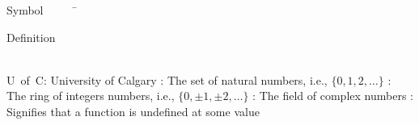 


\begin{tabbing}
Symbol~~~~~\= \ \ \ \ \ \ \ \ \ \ \ \ \ \ \ \ \ \ \ \ \ \ \ \ \ \ \ \ \ \ \ \ \ \ \ \  \parbox{5in}{Definition}\\

\addsymbol \mbox{U of C}: {University of Calgary}
\addsymbol \mbox{\nat}: {The set of natural numbers, i.e., $\{0,1,2,\ldots\}$}
\addsymbol \mbox{\integers}: {The ring of integers numbers, i.e., $\{0,\pm1,\pm2,\ldots\}$}
\addsymbol \mbox{\complex}: {The field of complex numbers}
\addsymbol \mbox{\uparrow}: {Signifies that a function is undefined at some value}
\end{tabbing}
